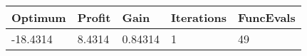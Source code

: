 \begin{tabular}{lllll}
Optimum & Profit & Gain & Iterations & FuncEvals \\ 
\hline 
-18.4314 & 8.4314 & 0.84314 & 1 & 49 \\ 
\hline 
\end{tabular}